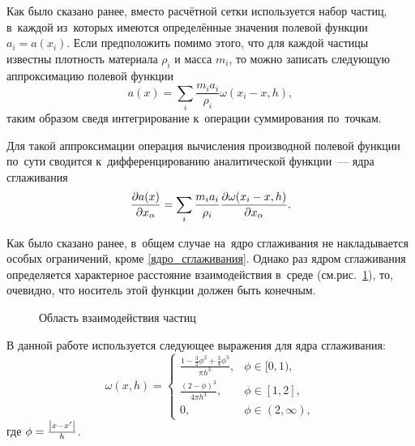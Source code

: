 \documentclass[thesis.tex]{subfiles}
\begin{document}
Как было сказано ранее, вместо расчётной сетки используется набор частиц, в~каждой из~которых имеются определённые
значения полевой функции $a_i = a(x_i)$. Если предположить помимо этого, что для каждой частицы известны плотность
материала $\rho_i$ и масса $m_i$, то можно записать следующую аппроксимацию полевой функции
\[
    a(x) = \sum_i \frac{m_i a_i}{\rho_i}\omega(x_i-x,h),
\]
таким образом сведя интегрирование к~операции суммирования по~точкам.

Для такой аппроксимации операция вычисления производной полевой функции по~сути сводится к~дифференцированию
аналитической функции~--- ядра сглаживания
\[
    \frac{\partial{a(x)}}{\partial{x_{\alpha}}} = \sum_i \frac{m_i a_i}{\rho_i}\frac{\partial{\omega(x_i-x,h)}}{\partial{x_{\alpha}}}.
\]

Как было сказано ранее, в~общем случае на~ядро сглаживания не накладывается особых ограничений, кроме \ref{ядро_сглаживания}.
Однако раз ядром сглаживания определяется характерное расстояние взаимодействия в~среде (см.рис.~\ref{рис:ядро_сглаживания}),
то, очевидно, что носитель этой функции должен быть конечным.

\begin{figure}[h]
    \begin{center}
        
    \end{center}
    \caption{Область взаимодействия частиц}
    \label{рис:ядро_сглаживания}
\end{figure}

В данной работе используется следующее выражения для ядра сглаживания:
\begin{equation}
    \omega(x,h) = \left\{\begin{aligned}
        \frac{1-\frac{3}{2}\phi^2+\frac{3}{4}\phi^3}{\pi h^3}, & \phi \in [0,1), \nonumber \\
        \frac{(2-\phi)^3}{4\pi h^3}, & \phi \in [1,2], \nonumber \\
        0, & \phi \in (2, \infty),
    \end{aligned} \right.
\end{equation}
где $\phi = \frac{\left|x-x'\right|}{h}$.
\end{document}
